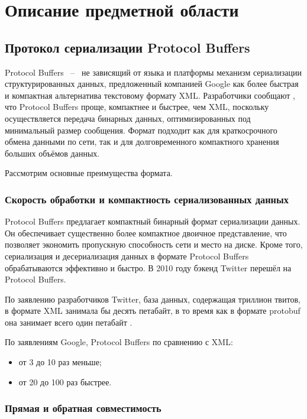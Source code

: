 \section{Описание предметной области}

\subsection{Протокол сериализации Protocol Buffers}

Protocol Buffers ~--~ не зависящий от языка и платформы механизм сериализации структурированных данных, предложенный компанией Google 
как более быстрая и компактная альтернатива текстовому формату XML. Разработчики сообщают \cite{protobuf_doc}, что Protocol Buffers проще, 
компактнее и быстрее, чем XML, поскольку осуществляется передача бинарных данных, оптимизированных под минимальный размер сообщения. 
Формат подходит как для краткосрочного обмена данными по сети, так и для долговременного компактного хранения больших объёмов данных.

Рассмотрим основные преимущества формата.

\subsubsection{Скорость обработки и компактность сериализованных данных}

Protocol Buffers предлагает компактный бинарный формат сериализации данных.
Он обеспечивает существенно более компактное двоичное представление, что позволяет экономить пропускную способность сети и место на диске\cite{protobuf_book}. 
Кроме того, сериализация и десериализация данных в формате Protocol Buffers обрабатываются эффективно и быстро.
В 2010 году бэкенд Twitter перешёл на Protocol Buffers.

По заявлению разработчиков Twitter, база данных, содержащая триллион твитов, в формате XML занимала бы десять петабайт, в то время как в формате protobuf она занимает всего один петабайт \cite{protobuf_twitter}.

По заявлениям Google, Protocol Buffers по сравнению с XML:
\begin{itemize}
    \item от 3 до 10 раз меньше;
    \item от 20 до 100 раз быстрее.
\end{itemize}

\subsubsection{Прямая и обратная совместимость}

